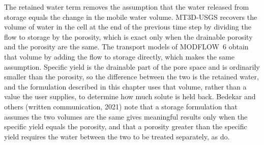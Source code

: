The retained water term removes the assumption that the water released from storage equals the change in the mobile water volume. MT3D-USGS recovers the volume of water in the cell at the end of the previous time step by dividing the flow to storage by the porosity, which is exact only when the drainable porosity and the porosity are the same. The transport models of MODFLOW~6 obtain that volume by adding the flow to storage directly, which makes the same assumption. Specific yield is the drainable part of the pore space and is ordinarily smaller than the porosity, so the difference between the two is the retained water, and the formulation described in this chapter uses that volume, rather than a value the user supplies, to determine how much solute is held back. Bedekar and others (written communication, 2021) note that a storage formulation that assumes the two volumes are the same gives meaningful results only when the specific yield equals the porosity, and that a porosity greater than the specific yield requires the water between the two to be treated separately, as \citet[eq.~26]{panday2008} do.
